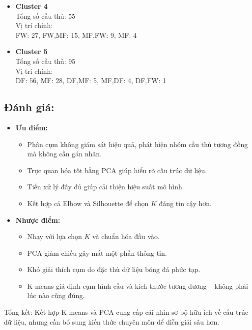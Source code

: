 \documentclass[12pt]{report}
\begin{document}
{\begin{itemize}
  \item \textbf{Cluster 4} \\
  Tổng số cầu thủ: 55 \\
  Vị trí chính: \\
  \quad FW: 27, FW,MF: 15, MF,FW: 9, MF: 4

  \item \textbf{Cluster 5} \\
  Tổng số cầu thủ: 95 \\
  Vị trí chính: \\
  \quad DF: 56, MF: 28, DF,MF: 5, MF,DF: 4, DF,FW: 1
 \end{itemize}
\subsection{Đánh giá:}
\begin{itemize}
  \item \textbf{Ưu điểm:}
  \begin{itemize}
    \item Phân cụm không giám sát hiệu quả, phát hiện nhóm cầu thủ tương đồng mà không cần gán nhãn.
    \item Trực quan hóa tốt bằng PCA giúp hiểu rõ cấu trúc dữ liệu.
    \item Tiền xử lý đầy đủ giúp cải thiện hiệu suất mô hình.
    \item Kết hợp cả Elbow và Silhouette để chọn $K$ đáng tin cậy hơn.
  \end{itemize}
  \item \textbf{Nhược điểm:}
  \begin{itemize}
    \item Nhạy với lựa chọn $K$ và chuẩn hóa đầu vào.
    \item PCA giảm chiều gây mất một phần thông tin.
    \item Khó giải thích cụm do đặc thù dữ liệu bóng đá phức tạp.
    \item K-means giả định cụm hình cầu và kích thước tương đương – không phải lúc nào cũng đúng.
  \end{itemize}
\end{itemize}

Tổng kết: Kết hợp K-means và PCA cung cấp cái nhìn sơ bộ hữu ích về cấu trúc dữ liệu, nhưng cần bổ sung kiến thức chuyên môn để diễn giải sâu hơn.
}
\end{document}
